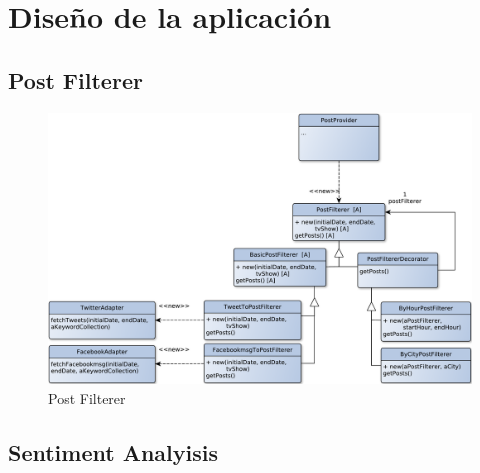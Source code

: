  

\section{Diseño de la aplicación}


\subsection{Post Filterer}

\begin{figure}[H]
\centering
\includegraphics[width=\textwidth]{graph/clase/filterer.pdf}
\caption{Post Filterer}
\end{figure}

\subsection{Sentiment Analyisis}

